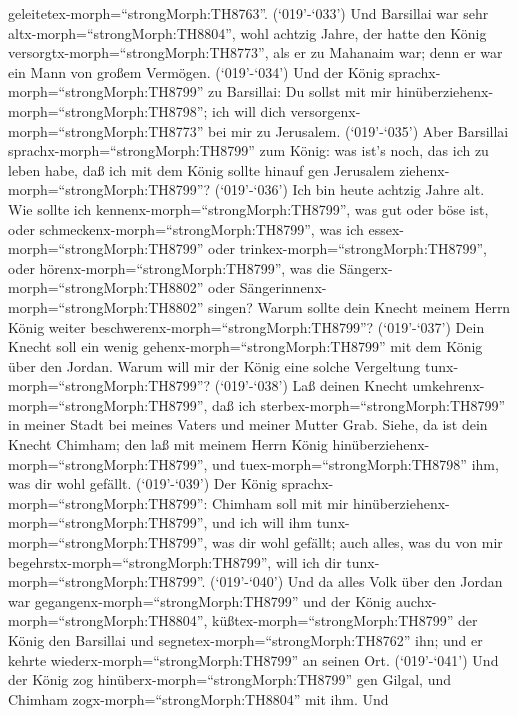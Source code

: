 geleitetex-morph=``strongMorph:TH8763''.  (`019'-`033') Und
Barsillai war sehr altx-morph=``strongMorph:TH8804'', wohl achtzig
Jahre, der hatte den König versorgtx-morph=``strongMorph:TH8773'', als
er zu Mahanaim war; denn er war ein Mann von großem Vermögen.
 (`019'-`034') Und der König
sprachx-morph=``strongMorph:TH8799'' zu Barsillai: Du sollst mit mir
hinüberziehenx-morph=``strongMorph:TH8798''; ich will dich
versorgenx-morph=``strongMorph:TH8773'' bei mir zu Jerusalem.
 (`019'-`035') Aber Barsillai
sprachx-morph=``strongMorph:TH8799'' zum König: was ist's noch, das ich
zu leben habe, daß ich mit dem König sollte hinauf gen Jerusalem
ziehenx-morph=``strongMorph:TH8799''?  (`019'-`036') Ich
bin heute achtzig Jahre alt. Wie sollte ich
kennenx-morph=``strongMorph:TH8799'', was gut oder böse ist, oder
schmeckenx-morph=``strongMorph:TH8799'', was ich
essex-morph=``strongMorph:TH8799'' oder
trinkex-morph=``strongMorph:TH8799'', oder
hörenx-morph=``strongMorph:TH8799'', was die
Sängerx-morph=``strongMorph:TH8802'' oder
Sängerinnenx-morph=``strongMorph:TH8802'' singen? Warum sollte dein
Knecht meinem Herrn König weiter
beschwerenx-morph=``strongMorph:TH8799''?  (`019'-`037')
Dein Knecht soll ein wenig gehenx-morph=``strongMorph:TH8799'' mit dem
König über den Jordan. Warum will mir der König eine solche Vergeltung
tunx-morph=``strongMorph:TH8799''?  (`019'-`038') Laß
deinen Knecht umkehrenx-morph=``strongMorph:TH8799'', daß ich
sterbex-morph=``strongMorph:TH8799'' in meiner Stadt bei meines Vaters
und meiner Mutter Grab. Siehe, da ist dein Knecht Chimham; den laß mit
meinem Herrn König hinüberziehenx-morph=``strongMorph:TH8799'', und
tuex-morph=``strongMorph:TH8798'' ihm, was dir wohl gefällt.
 (`019'-`039') Der König
sprachx-morph=``strongMorph:TH8799'': Chimham soll mit mir
hinüberziehenx-morph=``strongMorph:TH8799'', und ich will ihm
tunx-morph=``strongMorph:TH8799'', was dir wohl gefällt; auch alles, was
du von mir begehrstx-morph=``strongMorph:TH8799'', will ich dir
tunx-morph=``strongMorph:TH8799''.  (`019'-`040') Und da
alles Volk über den Jordan war gegangenx-morph=``strongMorph:TH8799''
und der König auchx-morph=``strongMorph:TH8804'',
küßtex-morph=``strongMorph:TH8799'' der König den Barsillai und
segnetex-morph=``strongMorph:TH8762'' ihn; und er kehrte
wiederx-morph=``strongMorph:TH8799'' an seinen Ort. 
(`019'-`041') Und der König zog hinüberx-morph=``strongMorph:TH8799''
gen Gilgal, und Chimham zogx-morph=``strongMorph:TH8804'' mit ihm. Und
